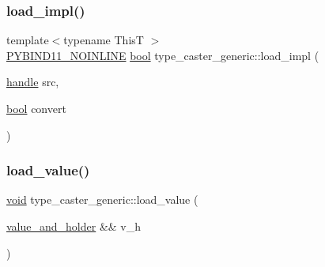 \subsubsection{\texorpdfstring{load\_impl()}{load\_impl()}}
{\footnotesize\ttfamily template$<$typename ThisT $>$ \\
\mbox{\hyperlink{detail_2common_8h_a1fb186b7494d5c576d902c0730ecbb71}{P\+Y\+B\+I\+N\+D11\+\_\+\+N\+O\+I\+N\+L\+I\+NE}} \mbox{\hyperlink{asdl_8h_af6a258d8f3ee5206d682d799316314b1}{bool}} type\+\_\+caster\+\_\+generic\+::load\+\_\+impl (\begin{DoxyParamCaption}\item[{\mbox{\hyperlink{classhandle}{handle}}}]{src,  }\item[{\mbox{\hyperlink{asdl_8h_af6a258d8f3ee5206d682d799316314b1}{bool}}}]{convert }\end{DoxyParamCaption})\hspace{0.3cm}{\ttfamily [inline]}}

\mbox{\label{classtype__caster__generic_ad532f221c703a0b54ccee305988a46d4}} 
\subsubsection{\texorpdfstring{load\_value()}{load\_value()}}
{\footnotesize\ttfamily \mbox{\hyperlink{_s_d_l__opengles2__gl2ext_8h_ae5d8fa23ad07c48bb609509eae494c95}{void}} type\+\_\+caster\+\_\+generic\+::load\+\_\+value (\begin{DoxyParamCaption}\item[{\mbox{\hyperlink{structvalue__and__holder}{value\+\_\+and\+\_\+holder}} \&\&}]{v\+\_\+h }\end{DoxyParamCaption})\hspace{0.3cm}{\ttfamily [inline]}}

\mbox{\label{classtype__caster__generic_a15be63015f7dc58ae09d57d9aaa71840}} 
